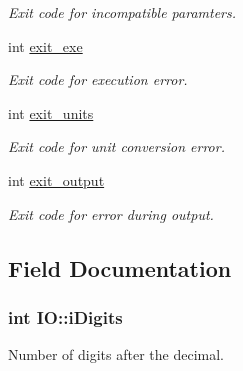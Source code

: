 \begin{DoxyCompactItemize}
\begin{DoxyCompactList}\small\item\em Exit code for incompatible paramters. \end{DoxyCompactList}\item 
\hypertarget{struct_i_o_aa99670dc0c579d23a517476b8e35b7cc}{}int \hyperlink{struct_i_o_aa99670dc0c579d23a517476b8e35b7cc}{exit\+\_\+exe}\label{struct_i_o_aa99670dc0c579d23a517476b8e35b7cc}

\begin{DoxyCompactList}\small\item\em Exit code for execution error. \end{DoxyCompactList}\item 
\hypertarget{struct_i_o_a81c2d0bcd89059611346c749b30ec400}{}int \hyperlink{struct_i_o_a81c2d0bcd89059611346c749b30ec400}{exit\+\_\+units}\label{struct_i_o_a81c2d0bcd89059611346c749b30ec400}

\begin{DoxyCompactList}\small\item\em Exit code for unit conversion error. \end{DoxyCompactList}\item 
\hypertarget{struct_i_o_a76edf71a5976e1baa2308b465cdb6675}{}int \hyperlink{struct_i_o_a76edf71a5976e1baa2308b465cdb6675}{exit\+\_\+output}\label{struct_i_o_a76edf71a5976e1baa2308b465cdb6675}

\begin{DoxyCompactList}\small\item\em Exit code for error during output. \end{DoxyCompactList}\end{DoxyCompactItemize}


\subsection{Field Documentation}
\hypertarget{struct_i_o_a69a5be3fbf5bb997287c9a00a324bc5c}{}
\subsubsection[{i\+Digits}]{\setlength{\rightskip}{0pt plus 5cm}int I\+O\+::i\+Digits}\label{struct_i_o_a69a5be3fbf5bb997287c9a00a324bc5c}


Number of digits after the decimal. 

\hypertarget{struct_i_o_a703b6e2abf0338ef9723604bc88af810}{}
